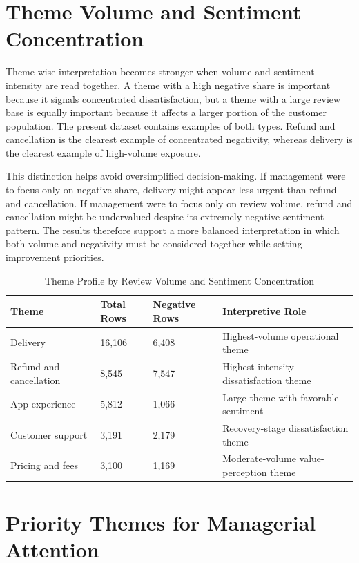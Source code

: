 \section{Theme Volume and Sentiment Concentration}

Theme-wise interpretation becomes stronger when volume and sentiment intensity are read together. A theme with a high negative share is important because it signals concentrated dissatisfaction, but a theme with a large review base is equally important because it affects a larger portion of the customer population. The present dataset contains examples of both types. Refund and cancellation is the clearest example of concentrated negativity, whereas delivery is the clearest example of high-volume exposure.

This distinction helps avoid oversimplified decision-making. If management were to focus only on negative share, delivery might appear less urgent than refund and cancellation. If management were to focus only on review volume, refund and cancellation might be undervalued despite its extremely negative sentiment pattern. The results therefore support a more balanced interpretation in which both volume and negativity must be considered together while setting improvement priorities.

\begin{table}[h]
\centering
\caption{Theme Profile by Review Volume and Sentiment Concentration}
\small
\begin{tabular}{L{0.27\textwidth}C{0.14\textwidth}C{0.15\textwidth}L{0.28\textwidth}}
\toprule
\textbf{Theme} & \textbf{Total Rows} & \textbf{Negative Rows} & \textbf{Interpretive Role} \\
\midrule
Delivery & 16,106 & 6,408 & Highest-volume operational theme \\
Refund and cancellation & 8,545 & 7,547 & Highest-intensity dissatisfaction theme \\
App experience & 5,812 & 1,066 & Large theme with favorable sentiment \\
Customer support & 3,191 & 2,179 & Recovery-stage dissatisfaction theme \\
Pricing and fees & 3,100 & 1,169 & Moderate-volume value-perception theme \\
\bottomrule
\end{tabular}
\normalsize
\end{table}

\section{Priority Themes for Managerial Attention}

